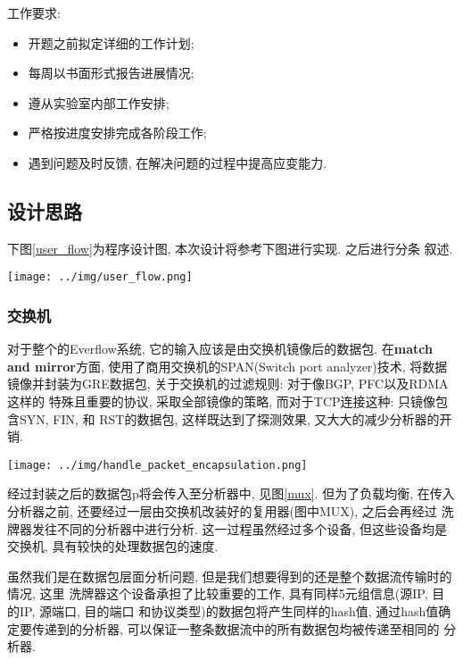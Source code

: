 {\begin{mdframed}[everyline=true]
工作要求:
\begin{itemize}
    \setlength\itemsep{0.1em}
    \item 开题之前拟定详细的工作计划;
    \item 每周以书面形式报告进展情况;
    \item 遵从实验室内部工作安排;
    \item 严格按进度安排完成各阶段工作;
    \item 遇到问题及时反馈, 在解决问题的过程中提高应变能力.
\end{itemize}

\subsection{设计思路}

  下图\ref{user_flow}为程序设计图, 本次设计将参考下图进行实现. 之后进行分条
叙述.

\begin{center}
    \texttt{[image: ../img/user\_flow.png]}
    \label{user_flow}
\end{center}

\subsubsection{交换机}

  对于整个的Everflow系统, 它的输入应该是由交换机镜像后的数据包.
在\textbf{match and mirror}方面,
使用了商用交换机的SPAN(Switch port analyzer)技术,
将数据镜像并封装为GRE数据包, 关于交换机的过滤规则: 对于像BGP,
PFC以及RDMA这样的 特殊且重要的协议, 采取全部镜像的策略,
而对于TCP连接这种: 只镜像包含SYN, FIN, 和 RST的数据包,
这样既达到了探测效果, 又大大的减少分析器的开销.

\begin{center}
    \texttt{[image: ../img/handle\_packet\_encapsulation.png]}
    \label{mux}
\end{center}

经过封装之后的数据包p将会传入至分析器中, 见图\ref{mux}. 但为了负载均衡,
在传入分析器之前, 还要经过一层由交换机改装好的复用器(图中MUX),
之后会再经过 洗牌器发往不同的分析器中进行分析. 这一过程虽然经过多个设备,
但这些设备均是交换机, 具有较快的处理数据包的速度.

虽然我们是在数据包层面分析问题,
但是我们想要得到的还是整个数据流传输时的情况, 这里
洗牌器这个设备承担了比较重要的工作, 具有同样5元组信息(源IP, 目的IP,
源端口, 目的端口 和协议类型)的数据包将产生同样的hash值,
通过hash值确定要传递到的分析器,
可以保证一整条数据流中的所有数据包均被传递至相同的 分析器.


\end{mdframed}}

